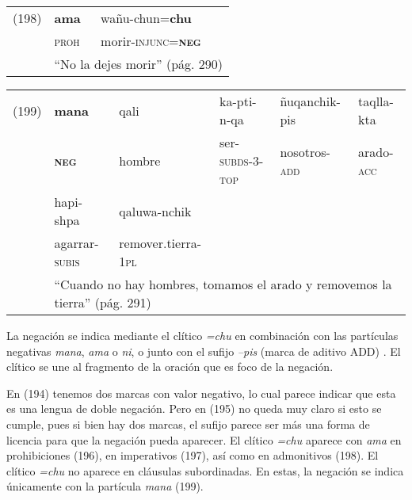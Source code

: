 {%
\noindent \begin{tabular}{lll}
(198) & \textbf{ama} & wañu-chun=\textbf{chu} \\
& \textsc{proh} & morir-\textsc{injunc=\textbf{neg}} \\
& \multicolumn{2}{l}{``No la dejes morir'' (pág. 290)}
\end{tabular} \vspace{0.1cm}

{\small
\noindent \begin{tabular}{llllll}
(199) & \textbf{mana} & qali & ka-pti-n-qa & ñuqanchik-pis & taqlla-kta \\
& \textsc{\textbf{neg}} & hombre & ser-\textsc{subds-3-top} & nosotros-\textsc{add} & arado-\textsc{acc} \\
& hapi-shpa & qaluwa-nchik \\
& agarrar-\textsc{subis} & remover.tierra-\textsc{1pl} \\
& \multicolumn{5}{l}{``Cuando no hay hombres, tomamos el arado y removemos la tierra'' (pág. 291)}
\end{tabular} \vspace{0.2cm}}
}

La negación se indica mediante el clítico {\setmainfont{Charis SIL} \textit{=chu}} en combinación con las partículas negativas {\setmainfont{Charis SIL} \textit{mana}}, {\setmainfont{Charis SIL} \textit{ama}} o {\setmainfont{Charis SIL} \textit{ni}}, o junto con el sufijo {\setmainfont{Charis SIL} \textit{–pis}} (marca de aditivo ADD) \textcolor{MidnightBlue}{\citep{yauyos}}. El clítico se une al fragmento de la oración que es foco de la negación.

En (194) tenemos dos marcas con valor negativo, lo cual parece indicar que esta es una lengua de doble negación. Pero en (195) no queda muy claro si esto se cumple, pues si bien hay dos marcas, el sufijo {\setmainfont{Charis SIL} \textit{}} parece ser más una forma de licencia para que la negación pueda aparecer. El clítico {\setmainfont{Charis SIL} \textit{=chu}} aparece con {\setmainfont{Charis SIL} \textit{ama}} en prohibiciones (196), en imperativos (197), así como en admonitivos (198). El clítico {\setmainfont{Charis SIL} \textit{=chu}} no aparece en cláusulas subordinadas. En estas, la negación se indica únicamente con la partícula {\setmainfont{Charis SIL} \textit{mana}} (199).